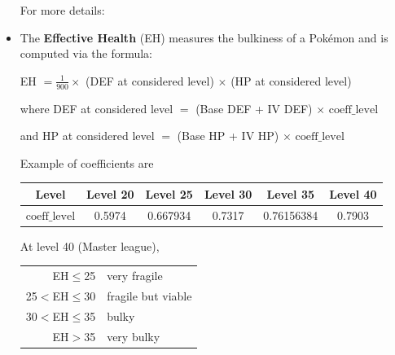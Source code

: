 \documentclass[12pt]{beamer}
\begin{document}
\begin{frame}
\begin{block}{}
\begin{footnotesize}
\begin{itemize}
 For more details: 
 \begin{center}
   \href{https://pokemongohub.net/post/pvp/pvp-move-stats-in-pokemon-go/}{}
   \end{center}
 
 \item The \textbf{Effective Health} (EH) measures the bulkiness of a Pok\'emon and is computed via the formula:
\begin{center}
EH $= \frac{1}{900} \times$ (DEF at considered level) $\times$ (HP at considered level) 
\end{center}

where DEF at considered level $=$ (Base DEF + IV DEF) $\times$ $\text{coeff}\_\text{level}$ 

and HP at considered level $=$ (Base HP + IV HP) $\times$ $\text{coeff}\_\text{level}$

Example of coefficients are

\begin{center}
\begin{tabular}{cccccc} 
Level &   Level 20 &  Level 25 &  Level 30 &  Level 35 &  Level 40 \\ \hline
$\text{coeff}\_\text{level}$ &   0.5974 & 0.667934 & 0.7317 & 0.76156384 & 0.7903 \\
\end{tabular}   
\end{center}

At level 40 (Master league),

\begin{center}
\begin{tabular}{rl}
EH$\leq$25  & very fragile \\
25$<$EH$\leq$30  & fragile but viable \\
30$<$EH$\leq$35  & bulky \\
EH$>$35  & very bulky \\
\end{tabular}
\end{center}

\end{itemize}
\end{footnotesize}
\end{block}
\end{frame}
\end{document}
